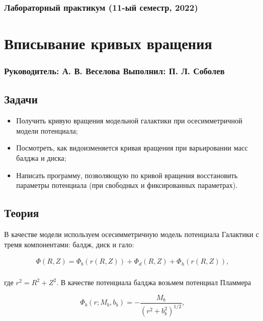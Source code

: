 \documentclass[a4paper, oneside]{article}
\newcommand{\su}{\vspace{-0.5em}}
\begin{document}
\subsubsection*{Лабораторный практикум (11-ый семестр, 2022)}
\section*{Вписывание кривых вращения}
\subsubsection*{Руководитель: А. В. Веселова \hspace{2em} Выполнил: П. Л. Соболев}

\vspace{3em}

\subsection*{Задачи}

\begin{itemize}
  \setlength\itemsep{-0.1em}
  \item Получить кривую вращения модельной галактики при осесимметричной модели потенциала;
  \item Посмотреть, как видоизменяется кривая вращения при варьировании масс балджа и диска;
  \item Написать программу, позволяющую по кривой вращения восстановить параметры потенциала (при свободных и фиксированных параметрах).
\end{itemize}

\subsection*{Теория}

В качестве модели используем осесимметричную модель потенциала Галактики с тремя компонентами: балдж, диск и гало:

\su
\begin{equation}
\begin{gathered}
  \Phi(R, Z) = \Phi_b(r(R, Z)) + \Phi_d(R, Z) + \Phi_h(r(R, Z)), \\
\end{gathered}
\end{equation}

где $ r^2 = R^2 + Z^2 $. В качестве потенциала балджа возьмем потенциал Пламмера

\su
\begin{equation}
  \Phi_b(r; M_b, b_b) = - \frac{M_b}{(r^2 + b_b^2)^{1/2}},
\end{equation}
\end{document}
